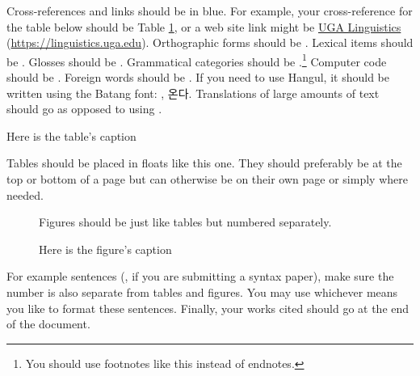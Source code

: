     Cross-references and links should be in blue.
    For example, your cross-reference for the table below should be Table \ref{tab:example}, or a web site link might be \href{https://linguistics.uga.edu}{UGA Linguistics} (\url{https://linguistics.uga.edu}).
    Orthographic forms should be .
    Lexical items should be .
    Glosses should be .
    Grammatical categories should be .\footnote{
      You should use footnotes like this instead of endnotes.
    }
    Computer code should be .
    Foreign words should be .
    If you need to use Hangul, it should be written using the Batang font: , {\hangul 온다}.
    Translations of large amounts of text should go  as opposed to using .

    \begin{table}[tbhp]
      \begin{center}
        \caption{Here is the table's caption}
        \label{tab:example}
        Tables should be placed in floats like this one.
        They should preferably be at the top or bottom of a page but can otherwise be on their own page or simply where needed.
      \end{center}
    \end{table}

    \begin{figure}[tbhp]
      \begin{center}
        \caption{Here is the figure's caption}
        \label{tab:example}
        Figures should be just like tables but numbered separately.
      \end{center}
    \end{figure}

    For example sentences (, if you are submitting a syntax paper), make sure the number is also separate from tables and figures.
    You may use whichever means you like to format these sentences.
    Finally, your works cited should go at the end of the document.

  \printbibliography %
